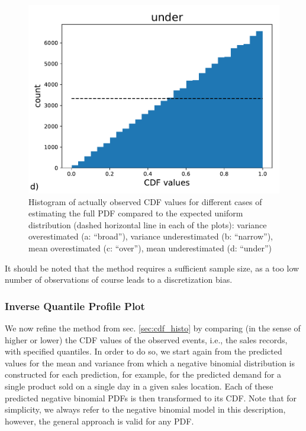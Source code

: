 \documentclass[BCOR=1mm, DIV=calc,10pt,
twoside=true,
twocolumn,
headings=normal]{scrartcl}
\begin{document}
\begin{figure}
\begin{center}
\includegraphics[scale=0.25]{figs/cdf_truth_under}
\caption{\label{fig:cdf_histos} Histogram of actually observed CDF values for different cases of estimating the full PDF compared to the expected uniform distribution (dashed horizontal line in each of the plots): variance overestimated (a: ``broad''), variance underestimated (b: ``narrow''), mean overestimated (c: ``over''), mean underestimated (d: ``under'')}
\end{center}
\end{figure}

\noindent
It should be noted that the method requires a sufficient sample size, as a too low number of observations of course leads to a discretization bias.

\subsubsection{Inverse Quantile Profile Plot}

We now refine the method from sec. \ref{sec:cdf_histo} by comparing (in the sense of higher or lower) the CDF values of the observed events, i.e., the sales records, with specified quantiles. In order to do so, we start again from the predicted values for the mean and variance from which a negative binomial distribution is constructed for each prediction, for example, for the predicted demand for a single product sold on a single day in a given sales location. Each of these predicted negative binomial PDFs is then transformed to its CDF. Note that for simplicity, we always refer to the negative binomial model in this description, however, the general approach is valid for any PDF.
\end{document}
